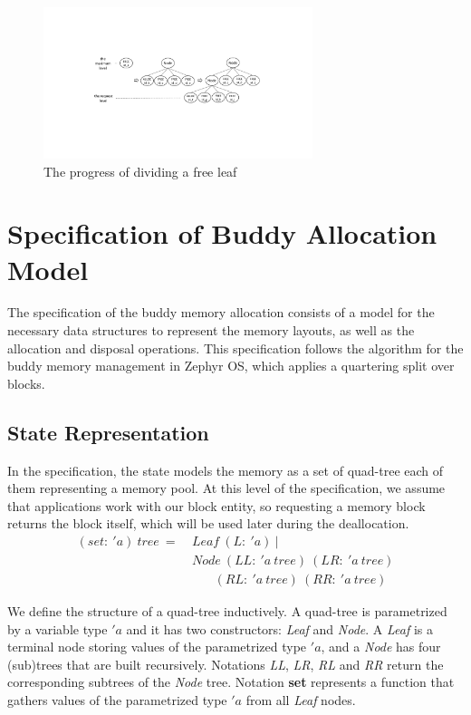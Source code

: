 
\begin{figure}[htbp]
	\centering
	\includegraphics[width=0.7\textwidth]{fig1.pdf}
	\caption{The progress of dividing a free leaf}
	\label{fig:splitleaf}
\end{figure}

\section{Specification of Buddy Allocation Model}\label{sec:spec}
The specification of the buddy memory allocation consists of a model for the necessary data structures to represent the memory layouts, as well as the allocation and disposal operations. This specification follows the algorithm for the buddy memory management in Zephyr OS, which applies a quartering split over blocks.

\subsection{State Representation}\label{statedes}
In the specification, the state models the memory as a set of quad-tree each of them representing a memory pool. At this level of the specification, we assume that applications work with our block entity, so requesting a memory block returns the block itself, which will be used later during the deallocation.
\begin{align*}
(set:\ 'a)\ tree\ =\ &Leaf\ (L:\ 'a)\ | \\
&Node\ (LL:\ 'a\ tree)\ (LR:\ 'a\ tree)\\
&\ \ \ \ \ \ \ \ (RL:\ 'a\ tree)\ (RR:\ 'a\ tree)
\end{align*}

We define the structure of a quad-tree inductively. A quad-tree is parametrized by a variable type $'a$ and it has two constructors: \emph{Leaf} and \emph{Node}. A \emph{Leaf} is a terminal node storing values of the parametrized type $'a$, and a \emph{Node} has four (sub)trees that are built recursively. Notations \emph{LL}, \emph{LR}, \emph{RL} and \emph{RR} return the corresponding subtrees of the \emph{Node} tree. Notation \textbf{set} represents a function that gathers values of the parametrized type $'a$ from all \emph{Leaf} nodes.


